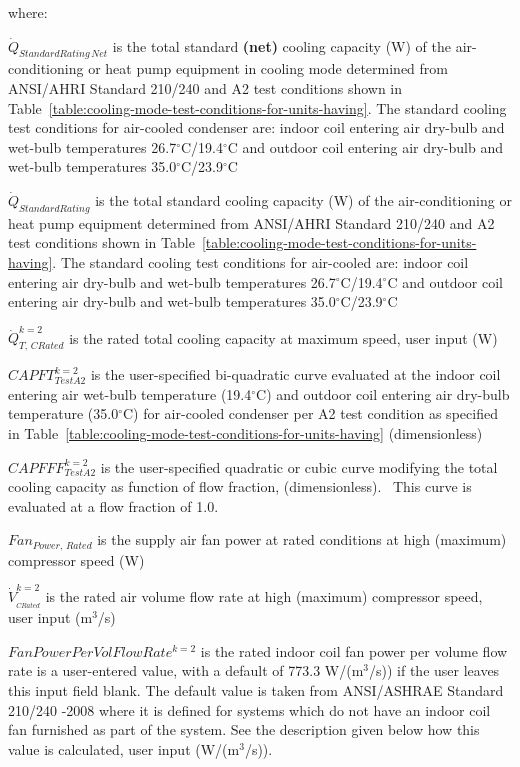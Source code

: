 where:

\({\dot Q_{StandardRating\,Net}}\) is the total standard \textbf{(net)} cooling capacity (W) of the air-conditioning or heat pump equipment in cooling mode determined from ANSI/AHRI Standard 210/240 and A2 test conditions shown in Table~\ref{table:cooling-mode-test-conditions-for-units-having}. The standard cooling test conditions for air-cooled condenser are: indoor coil entering air dry-bulb and wet-bulb temperatures 26.7\(^{\circ}\)C/19.4\(^{\circ}\)C and outdoor coil entering air dry-bulb and wet-bulb temperatures 35.0\(^{\circ}\)C/23.9\(^{\circ}\)C

\({\dot Q_{StandardRating}}\) is the total standard cooling capacity (W) of the air-conditioning or heat pump equipment determined from ANSI/AHRI Standard 210/240 and A2 test conditions shown in Table~\ref{table:cooling-mode-test-conditions-for-units-having}. The standard cooling test conditions for air-cooled are: indoor coil entering air dry-bulb and wet-bulb temperatures 26.7\(^{\circ}\)C/19.4\(^{\circ}\)C and outdoor coil entering air dry-bulb and wet-bulb temperatures 35.0\(^{\circ}\)C/23.9\(^{\circ}\)C

\(\dot Q_{T,\,CRated}^{k = 2}\) is the rated total cooling capacity at maximum speed, user input (W)

\(CAPFT_{TestA2}^{k = 2}\) is the user-specified bi-quadratic curve evaluated at the indoor coil entering air wet-bulb temperature (19.4\(^{\circ}\)C) and outdoor coil entering air dry-bulb temperature (35.0\(^{\circ}\)C) for air-cooled condenser per A2 test condition as specified in Table~\ref{table:cooling-mode-test-conditions-for-units-having} (dimensionless)

\(CAPFFF_{TestA2}^{k = 2}\) is the user-specified quadratic or cubic curve modifying the total cooling capacity as function of flow fraction, (dimensionless).~ This curve is evaluated at a flow fraction of 1.0.

\(Fa{n_{Power,\,Rated}}\) is the supply air fan power at rated conditions at high (maximum) compressor speed (W)

\(\dot V_{_{CRated}}^{k = 2}\) is the rated air volume flow rate at high (maximum) compressor speed, user input (m\(^{3}\)/s)

\(FanPowerPerVolFlowRat{e^{k = 2}}\) is the rated indoor coil fan power per volume flow rate is a user-entered value, with a default of 773.3 W/(m\(^{3}\)/s)) if the user leaves this input field blank. The default value is taken from ANSI/ASHRAE Standard 210/240 -2008 where it is defined for systems which do not have an indoor coil fan furnished as part of the system. See the description given below how this value is calculated, user input (W/(m\(^{3}\)/s)).

